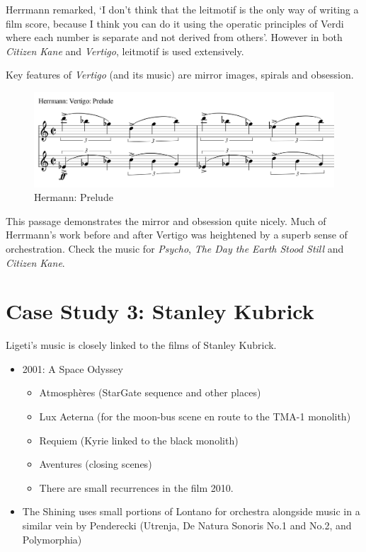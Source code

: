 \begin{itemize}
Herrmann remarked, `I don't think that the leitmotif is the only way of writing a film score, because I think you can do it using the operatic principles of Verdi where each number is separate and not derived from others'. However in both \textit{Citizen Kane} and \textit{Vertigo}, leitmotif is used extensively. 

Key features of \textit{Vertigo} (and its music) are mirror images, spirals and obsession. 

\begin{figure}[H]
\centering
\includegraphics[scale=0.8]{herrmann-prelude}\caption{Hermann: Prelude}
\label{fig:Hermann-prelude}
\end{figure}

This passage demonstrates the mirror and obsession quite nicely. Much of Herrmann's work before and after Vertigo was heightened by a superb sense of orchestration. Check the music for \textit{Psycho}, \textit{The Day the Earth Stood Still} and \textit{Citizen Kane}. 
\end{itemize}




\section{Case Study 3: Stanley Kubrick}
Ligeti's music is closely linked to the films of Stanley Kubrick. 
\begin{itemize}
\item 2001: A Space Odyssey
\begin{itemize}
\item Atmosphères (StarGate sequence and other places) 
\item Lux Aeterna (for the moon-bus scene en route to the TMA-1 monolith)
\item Requiem (Kyrie linked to the black monolith)
\item Aventures (closing scenes)
\item There are small recurrences in the film 2010.
\end{itemize}
\item The Shining uses small portions of Lontano for orchestra alongside music in a similar vein by Penderecki (Utrenja, De Natura Sonoris No.1 and No.2, and Polymorphia)
\end{itemize}

